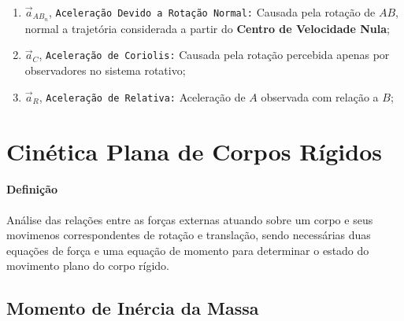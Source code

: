 \documentclass{article}
\begin{document}
\begin{enumerate}[rightmargin = \leftmargin]
\begin{enumerate}[rightmargin = \leftmargin]
                            \item $\vec{a}_{AB_{n}}$, \texttt{Aceleração Devido a Rotação Normal:} Causada pela rotação de $AB$, normal a trajetória considerada a partir do \textbf{Centro de Velocidade Nula};

                            \item $\vec{a}_{C}$, \texttt{Aceleração de Coriolis:} Causada pela rotação percebida apenas por observadores no sistema rotativo;

                            \item $\vec{a}_{R}$, \texttt{Aceleração de Relativa:} Aceleração de $A$ observada com relação a $B$;
                        \end{enumerate}
                \end{enumerate}
\newpage

    \section{Cinética Plana de Corpos Rígidos}
        \paragraph{Definição}Análise das relações entre as forças externas atuando sobre um corpo e seus movimenos correspondentes de rotação e translação, sendo necessárias duas equações de força e uma equação de momento para determinar o estado do movimento plano do corpo rígido.

        \subsection{Momento de Inércia da Massa}
\end{document}
